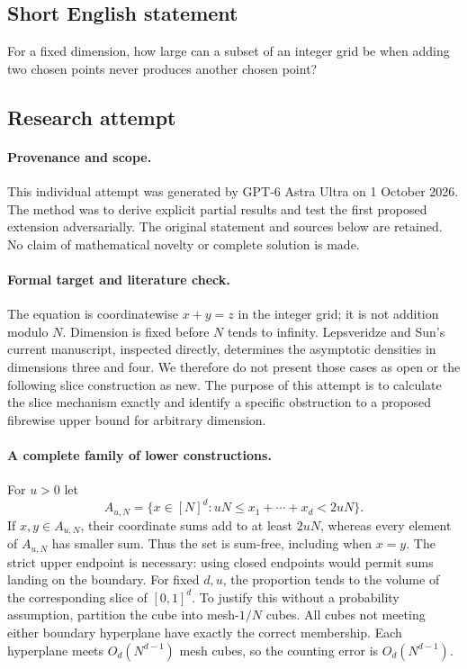 \documentclass[11pt,a4paper]{article}
\begin{document}
\subsection{Short English statement}

For a fixed dimension, how large can a subset of an integer grid be when adding two chosen points never produces another chosen point?

\subsection{Research attempt}

\paragraph{Provenance and scope.}
This individual attempt was generated by GPT-6 Astra Ultra on 1 October 2026. The method was to derive explicit partial results and test the first proposed extension adversarially. The original statement and sources below are retained. No claim of mathematical novelty or complete solution is made.

\paragraph{Formal target and literature check.}
The equation is coordinatewise $x+y=z$ in the integer grid; it is not addition modulo $N$. Dimension is fixed before $N$ tends to infinity. Lepsveridze and Sun's current manuscript, inspected directly, determines the asymptotic densities in dimensions three and four. We therefore do not present those cases as open or the following slice construction as new. The purpose of this attempt is to calculate the slice mechanism exactly and identify a specific obstruction to a proposed fibrewise upper bound for arbitrary dimension.

\paragraph{A complete family of lower constructions.}
For $u>0$ let
\[
 A_{u,N}=\{x\in[N]^d:uN\leq x_1+\cdots+x_d<2uN\}.
\]
If $x,y\in A_{u,N}$, their coordinate sums add to at least $2uN$, whereas every element of $A_{u,N}$ has smaller sum. Thus the set is sum-free, including when $x=y$. The strict upper endpoint is necessary: using closed endpoints would permit sums landing on the boundary.
For fixed $d,u$, the proportion tends to the volume of the corresponding slice of $[0,1]^d$. To justify this without a probability assumption, partition the cube into mesh-$1/N$ cubes. All cubes not meeting either boundary hyperplane have exactly the correct membership. Each hyperplane meets $O_d(N^{d-1})$ mesh cubes, so the counting error is $O_d(N^{d-1})$.
\end{document}
